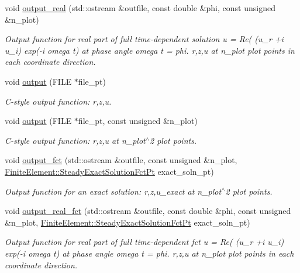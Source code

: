 \begin{DoxyCompactItemize}
void \hyperlink{classoomph_1_1QPMLFourierDecomposedHelmholtzElement_a2324f6992b4fe00f67684a2da86f999e}{output\+\_\+real} (std\+::ostream \&outfile, const double \&phi, const unsigned \&n\+\_\+plot)
\begin{DoxyCompactList}\small\item\em Output function for real part of full time-\/dependent solution u = Re( (u\+\_\+r +i u\+\_\+i) exp(-\/i omega t) at phase angle omega t = phi. r,z,u at n\+\_\+plot plot points in each coordinate direction. \end{DoxyCompactList}\item 
void \hyperlink{classoomph_1_1QPMLFourierDecomposedHelmholtzElement_ade1081cf429f5dd7c90e83ef924f9bea}{output} (F\+I\+LE $\ast$file\+\_\+pt)
\begin{DoxyCompactList}\small\item\em C-\/style output function\+: r,z,u. \end{DoxyCompactList}\item 
void \hyperlink{classoomph_1_1QPMLFourierDecomposedHelmholtzElement_ad0cc7d26df69a746a4b667ee447d4a7a}{output} (F\+I\+LE $\ast$file\+\_\+pt, const unsigned \&n\+\_\+plot)
\begin{DoxyCompactList}\small\item\em C-\/style output function\+: r,z,u at n\+\_\+plot$^\wedge$2 plot points. \end{DoxyCompactList}\item 
void \hyperlink{classoomph_1_1QPMLFourierDecomposedHelmholtzElement_a502b29e718eed748e36e28a5b5a229f0}{output\+\_\+fct} (std\+::ostream \&outfile, const unsigned \&n\+\_\+plot, \hyperlink{classoomph_1_1FiniteElement_a690fd33af26cc3e84f39bba6d5a85202}{Finite\+Element\+::\+Steady\+Exact\+Solution\+Fct\+Pt} exact\+\_\+soln\+\_\+pt)
\begin{DoxyCompactList}\small\item\em Output function for an exact solution\+: r,z,u\+\_\+exact at n\+\_\+plot$^\wedge$2 plot points. \end{DoxyCompactList}\item 
void \hyperlink{classoomph_1_1QPMLFourierDecomposedHelmholtzElement_a94735341244b53686f06fe1b37734650}{output\+\_\+real\+\_\+fct} (std\+::ostream \&outfile, const double \&phi, const unsigned \&n\+\_\+plot, \hyperlink{classoomph_1_1FiniteElement_a690fd33af26cc3e84f39bba6d5a85202}{Finite\+Element\+::\+Steady\+Exact\+Solution\+Fct\+Pt} exact\+\_\+soln\+\_\+pt)
\begin{DoxyCompactList}\small\item\em Output function for real part of full time-\/dependent fct u = Re( (u\+\_\+r +i u\+\_\+i) exp(-\/i omega t) at phase angle omega t = phi. r,z,u at n\+\_\+plot plot points in each coordinate direction. \end{DoxyCompactList}\item 

\end{DoxyCompactItemize}
